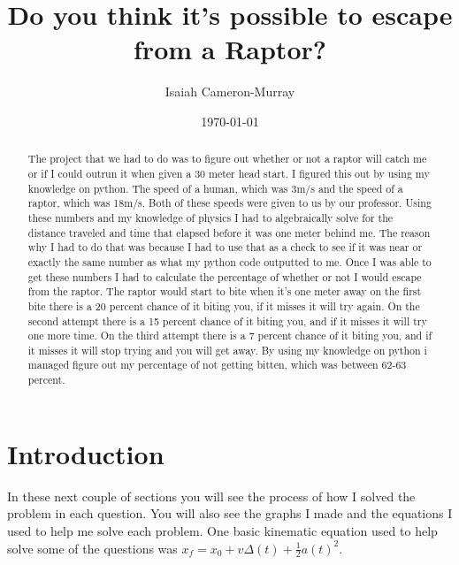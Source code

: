 \documentclass[twocolumn]{revtex4}
\begin{document}
\title{
Do you think it's possible to escape from a Raptor?  
}

\author{Isaiah Cameron-Murray}

\date{\today}

\begin{abstract}
    The project that we had to do was to figure out whether or not a raptor will catch me or if I could outrun it when given a 30 meter head start. I figured this out by using my knowledge on python. The speed of a human, which was 3m/s and the speed of a raptor, which was 18m/s. Both of these speeds were given to us by our professor. Using these numbers and my knowledge of physics I had to algebraically solve for the distance traveled and time that elapsed before it was one meter behind me. The reason why I had to do that was because I had to use that as a check to see if it was near or exactly the same number as what my python code outputted to me. Once I was able to get these numbers I had to calculate the percentage of whether or not I would escape from the raptor. The raptor would start to bite when it's one meter away on the first bite there is a 20 percent chance of it biting you, if it misses it will try again. On the second attempt there is a 15 percent chance of it biting you, and if it misses it will try one more time. On the third attempt there is a 7 percent chance of it biting you, and if it misses it will stop trying and you will get away. By using my knowledge on python i managed figure out my percentage of not getting bitten, which was between 62-63 percent.
    
\end{abstract}

\maketitle

\section{Introduction}

In these next couple of sections you will see the process of how I solved the problem in each question. You will also see the graphs I made and the equations I used to help me solve each problem. One basic kinematic equation used to help solve some of the questions was $x_f = x_0 + v\Delta(t) + \frac{1}{2}a(t)^2$.
\end{document}
